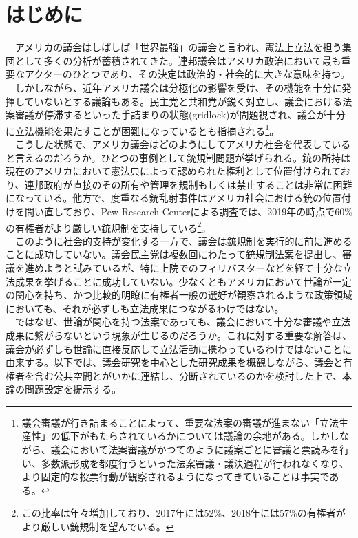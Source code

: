 \section{はじめに}
　アメリカの議会はしばしば「世界最強」の議会\citep*{2004-cr}と言われ、憲法上立法を担う集団として多くの分析が蓄積されてきた。連邦議会はアメリカ政治において最も重要なアクターのひとつであり、その決定は政治的・社会的に大きな意味を持つ。\\
　しかしながら、近年アメリカ議会は分極化の影響を受け、その機能を十分に発揮していないとする議論もある。民主党と共和党が鋭く対立し、議会における法案審議が停滞するといった手詰まりの状態(gridlock)が問題視され、議会が十分に立法機能を果たすことが困難になっているとも指摘される\footnote{議会審議が行き詰まることによって、重要な法案の審議が進まない「立法生産性」の低下がもたらされているかについては議論の余地がある。\citep*{}しかしながら、議会において法案審議がかつてのように議案ごとに審議と票読みを行い、多数派形成を都度行うといった法案審議・議決過程が行われなくなり、より固定的な投票行動が観察されるようになってきていることは事実である。\citep*{Poole2017-ir,Layman2006-tg}}。\\
　こうした状態で、アメリカ議会はどのようにしてアメリカ社会を代表していると言えるのだろうか。ひとつの事例として銃規制問題が挙げられる。銃の所持は現在のアメリカにおいて憲法典によって認められた権利として位置付けられており、連邦政府が直接のその所有や管理を規制もしくは禁止することは非常に困難になっている。他方で、度重なる銃乱射事件はアメリカ社会における銃の位置付けを問い直しており、Pew Research Centerによる調査では、2019年の時点で60\%の有権者がより厳しい銃規制を支持している\footnote{この比率は年々増加しており、2017年には52\%、2018年には57\%の有権者がより厳しい銃規制を望んでいる。}。\citep*{Schaeffer2019-ld}\\
　このように社会的支持が変化する一方で、議会は銃規制を実行的に前に進めることに成功していない。議会民主党は複数回にわたって銃規制法案を提出し、審議を進めようと試みているが、特に上院でのフィリバスターなどを経て十分な立法成果を挙げることに成功していない。少なくともアメリカにおいて世論が一定の関心を持ち、かつ比較的明瞭に有権者一般の選好が観察されるような政策領域においても、それが必ずしも立法成果につながるわけではない。\\
　ではなぜ、世論が関心を持つ法案であっても、議会において十分な審議や立法成果に繋がらないという現象が生じるのだろうか。これに対する重要な解答は、議会が必ずしも世論に直接反応して立法活動に携わっているわけではないことに由来する。以下では、議会研究を中心とした研究成果を概観しながら、議会と有権者を含む公共空間とがいかに連結し、分断されているのかを検討した上で、本論の問題設定を提示する。\\

